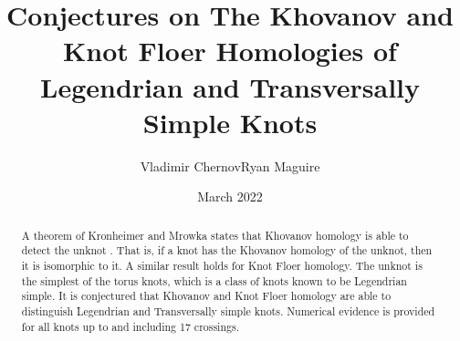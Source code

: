 \documentclass{article}
\title{Conjectures on The Khovanov and Knot Floer Homologies of
       Legendrian and Transversally Simple Knots}
\author{Vladimir Chernov\hspace{2em}Ryan Maguire}
\date{March 2022}
\theoremstyle{plain}
\begin{document}
    \maketitle
    \tableofcontents
    \begin{abstract}
        \noindent
        A theorem of Kronheimer and Mrowka states that Khovanov homology is
        able to detect the unknot \cite{JoshuaMSabloffWhatIsLegendrianKnot}.
        That is, if a knot has the Khovanov homology of the unknot, then it is
        isomorphic to it. A similar result holds for Knot Floer
        homology. The unknot is the simplest of the torus knots, which is a
        class of knots known to be Legendrian simple. It is conjectured that
        Khovanov and Knot Floer homology are able to distinguish Legendrian
        and Transversally simple knots. Numerical evidence is provided for
        all knots up to and including 17 crossings. 
	\end{abstract}
\end{document}
